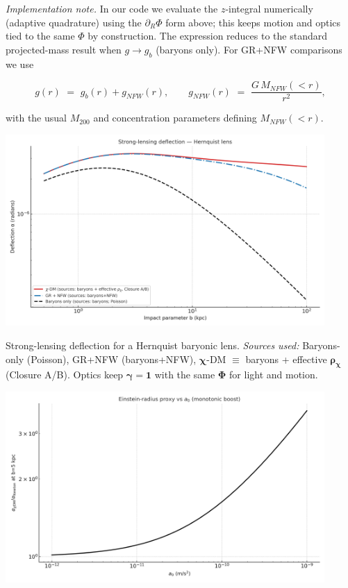 \documentclass[
]{article}
\begin{document}
\emph{Implementation note.} In our code we evaluate the \(z\)-integral
numerically (adaptive quadrature) using the \(\partial_{R}\Phi\) form
above; this keeps motion and optics tied to the same \(\Phi\) by
construction. The expression reduces to the standard projected-mass
result when \(g \rightarrow g_{b}\) (baryons only). For GR+NFW
comparisons we use

\[g(r)\mspace{6mu} = \mspace{6mu} g_{b}(r) + g_{NFW}(r),\quad\quad g_{NFW}(r)\mspace{6mu} = \mspace{6mu}\frac{G\, M_{NFW}( < r)}{r^{2}},\]

with the usual \(M_{200}\) and concentration parameters defining
\(M_{NFW}( < r)\).

\includegraphics[width=4.78333in,height=2.87in,alt={A graph of a graph AI-generated content may be incorrect.}]{letter_media/media/image6.png}

Strong-lensing deflection for a Hernquist baryonic lens. \emph{Sources
used:} Baryons-only (Poisson), GR+NFW (baryons+NFW),
\(\mathbf{\chi}\)-DM \(\mathbf{\equiv}\) baryons + effective
\(\mathbf{\rho}_{\mathbf{\chi}}\) (Closure A/B). Optics keep
\(\mathbf{\gamma}\mathbf{=}\mathbf{1}\) with the same \(\mathbf{\Phi}\)
for light and motion.

\includegraphics[width=4.78333in,height=2.87in,alt={A graph of a line AI-generated content may be incorrect.}]{letter_media/media/image7.png}
\end{document}
